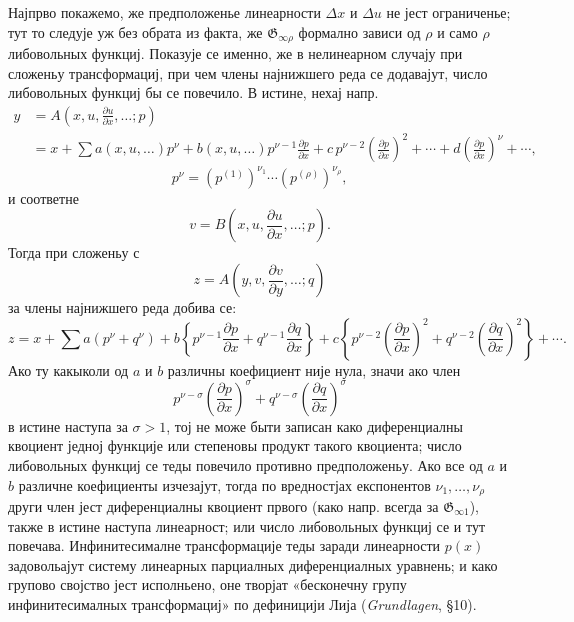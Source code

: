 ﻿\documentclass[11pt]{article}
\providecommand{\G}{\mathfrak G}
\providecommand{\D}{\Delta}
\providecommand{\p}{\partial}
\begin{document}
Најпрво покажемо, же предположенье линеарности \(\D x\) и \(\D u\) не јест ограниченье; тут то следује уж без обрата из факта, же \(\G_{\infty\rho}\) формално зависи од \(\rho\) и само \(\rho\) либовольных функциј. Показује се именно, же в нелинеарном случају при сложеньу трансформациј, при чем члены најнижшего реда се додавајут, число либовольных функциј бы се повечило. В истине, нехај напр.
\[
\begin{aligned}
y&=A\!\left(x,u,\frac{\p u}{\p x},\ldots;p\right)\\
&=x+\sum a(x,u,\ldots)p^\nu
+b(x,u,\ldots)p^{\nu-1}\frac{\p p}{\p x}
+c\,p^{\nu-2}\left(\frac{\p p}{\p x}\right)^2+\cdots
+d\left(\frac{\p p}{\p x}\right)^\nu+\cdots,
\end{aligned}
\]
\[
p^\nu=(p^{(1)})^{\nu_1}\cdots(p^{(\rho)})^{\nu_\rho},
\]
и соответне
\[
v=B\!\left(x,u,\frac{\p u}{\p x},\ldots;p\right).
\]
Тогда при сложеньу с
\[
z=A\!\left(y,v,\frac{\p v}{\p y},\ldots;q\right)
\]
за члены најнижшего реда добива се:
\[
z=x+\sum a(p^\nu+q^\nu)+
b\left\{p^{\nu-1}\frac{\p p}{\p x}+q^{\nu-1}\frac{\p q}{\p x}\right\}
+c\left\{p^{\nu-2}\left(\frac{\p p}{\p x}\right)^2
+q^{\nu-2}\left(\frac{\p q}{\p x}\right)^2\right\}+\cdots.
\]
Ако ту какыколи од \(a\) и \(b\) различны коефициент није нула, значи ако член
\[
p^{\nu-\sigma}\left(\frac{\p p}{\p x}\right)^\sigma
+q^{\nu-\sigma}\left(\frac{\p q}{\p x}\right)^\sigma
\]
в истине наступа за \(\sigma>1\), тој не може быти записан како диференциалны квоциент једној функције или степеновы продукт такого квоциента; число либовольных функциј се теды повечило противно предположеньу. Ако все од \(a\) и \(b\) различне коефициенты изчезајут, тогда по вредностјах експонентов \(\nu_1,\ldots,\nu_\rho\) други член јест диференциалны квоциент првого (како напр. всегда за \(\G_{\infty1}\)), также в истине наступа линеарност; или число либовольных функциј се и тут повечава. Инфинитесималне трансформације теды заради линеарности \(p(x)\) задовольајут систему линеарных парциалных диференциалных уравнень; и како групово својство јест исполньено, оне творјат «бесконечну групу инфинитесималных трансформациј» по дефиницији Лија (\emph{Grundlagen}, \S{}10).
\end{document}
